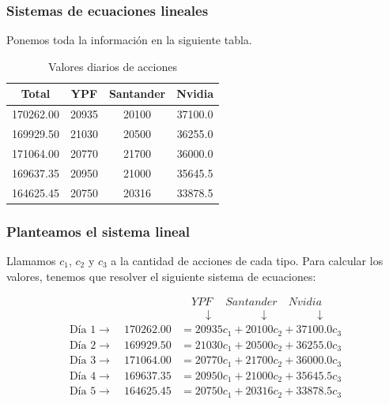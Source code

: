 \documentclass[aspectratio=169,12pt]{beamer}
\begin{document}
\begin{frame}
\frametitle{Sistemas de ecuaciones lineales}

Ponemos toda la información en la siguiente tabla.

\begin{table}[h]
    \centering
    \begin{tabular}{|c|c|c|c|}
        \hline
        Total & YPF & Santander & Nvidia \\
        \hline
        170262.00 & 20935 & 20100 & 37100.0 \\
        169929.50 & 21030 & 20500 & 36255.0 \\
        171064.00 & 20770 & 21700 & 36000.0 \\
        169637.35 & 20950 & 21000 & 35645.5 \\
        164625.45 & 20750 & 20316 & 33878.5 \\
        \hline
    \end{tabular}
    \caption{Valores diarios de acciones}
    \label{tab:my_table}
\end{table}

\end{frame}


\begin{frame}
\frametitle{Planteamos el sistema lineal}

Llamamos $c_1$, $c_2$ y $c_3$ a la cantidad de acciones de cada tipo.
Para calcular los valores, tenemos que resolver el siguiente sistema de ecuaciones:

\begin{align*}
& \quad YPF \quad \ Santander \quad Nvidia \\
& \quad \quad \downarrow \quad  \quad  \quad  \quad \downarrow  \quad  \quad \quad \quad \downarrow  \\
\text{D\'ia 1} \rightarrow \quad 170262.00	&= 20935	c_1 + 20100 c_2 + 37100.0 c_3 \\
\text{D\'ia 2} \rightarrow \quad 169929.50	&= 21030	c_1 + 20500 c_2 + 36255.0 c_3 \\
\text{D\'ia 3} \rightarrow \quad 171064.00	&= 20770	c_1 + 21700 c_2 + 36000.0 c_3 \\
\text{D\'ia 4} \rightarrow \quad 169637.35	&= 20950	c_1 + 21000 c_2 + 35645.5 c_3 \\
\text{D\'ia 5} \rightarrow \quad 164625.45	&= 20750	c_1 + 20316 c_2 + 33878.5 c_3 \\
\end{align*}

\end{frame}
\end{document}
